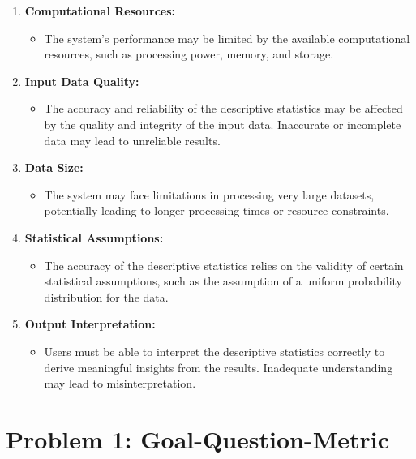 \documentclass[english,12pt,a4paper]{report}
\begin{document}
	\begin{enumerate}
		
	\item \textbf{Computational Resources:} 
	\begin{itemize}
		\item The system's performance may be limited by the available computational resources, such as processing power, memory, and storage.
	\end{itemize}

	\item \textbf{Input Data Quality:} 
	\begin{itemize}
		\item The accuracy and reliability of the descriptive statistics may be affected by the quality and integrity of the input data. Inaccurate or incomplete data may lead to unreliable results.
	\end{itemize}

	\item \textbf{Data Size:} 
	\begin{itemize}
		\item The system may face limitations in processing very large datasets, potentially leading to longer processing times or resource constraints.
	\end{itemize}

	\item \textbf{Statistical Assumptions:} 
	\begin{itemize}
		\item The accuracy of the descriptive statistics relies on the validity of certain statistical assumptions, such as the assumption of a uniform probability distribution for the data.
	\end{itemize}
	
	\item \textbf{Output Interpretation:} 
	\begin{itemize}
		\item Users must be able to interpret the descriptive statistics correctly to derive meaningful insights from the results. Inadequate understanding may lead to misinterpretation.
	\end{itemize}

	\end{enumerate}
	
	\chapter{Problem 1: Goal-Question-Metric}
\end{document}
